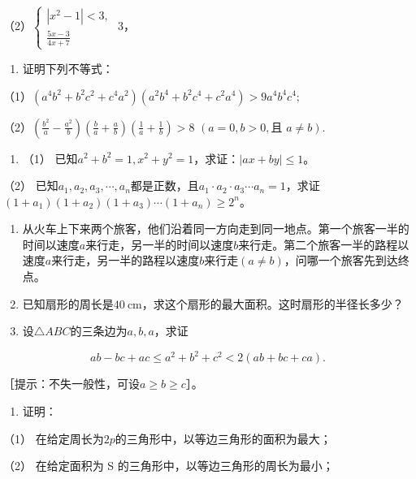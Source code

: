 （2）\(\left\{ \begin{array}{l} |x^2 - 1| < 3, \\ \frac{5x - 3}{4x + 7} \end{array} \right.\)
3，

\begin{enumerate}[start=5]
\item
  证明下列不等式：
\end{enumerate}

（1）\((a^4 b^2 + b^2 c^2 + c^4 a^2)(a^2 b^4 + b^2 c^4 + c^2 a^4) > 9a^4 b^4 c^4;\)

（2）\(\left(\frac{b^2}{a} - \frac{a^2}{b}\right)\left(\frac{b}{a} + \frac{a}{b}\right)\left(\frac{1}{a} + \frac{1}{b}\right) > 8\)
\((a=0, b>0, \text{且 } a\neq b).\)

\begin{enumerate}[start=6]
\item
  （1）
  已知\(a^2 + b^2 = 1, x^2 + y^2 = 1\)，求证：\(|ax + by| \leqslant 1\)。
\end{enumerate}

（2）
已知\(a_1, a_2, a_3, \cdots, a_n\)都是正数，且\(a_1 \cdot a_2 \cdot a_3 \cdots a_n = 1\)，求证\((1 + a_1)(1 + a_2)(1 + a_3) \cdots (1 + a_n) \geqslant 2^n\)。

\begin{enumerate}[start=7]
\item
  从火车上下来两个旅客，他们沿着同一方向走到同一地点。第一个旅客一半的时间以速度\(a\)来行走，另一半的时间以速度\(b\)来行走。第二个旅客一半的路程以速度\(a\)来行走，另一半的路程以速度\(b\)来行走\((a \neq b)\)，问哪一个旅客先到达终点。
\item
  已知扇形的周长是\(40 \mathrm{~cm}\)，求这个扇形的最大面积。这时扇形的半径长多少？
\item
  设\(\triangle ABC\)的三条边为\(a, b, a\)，求证
\end{enumerate}

\[
a b - b c + a c \leqslant a^{2} + b^{2} + c^{2} < 2 (a b + b c + c a).
\]

［提示：不失一般性，可设\(a \geqslant b \geqslant c\)］。

\begin{enumerate}[start=10]
\item
  证明：
\end{enumerate}

（1） 在给定周长为\(2p\)的三角形中，以等边三角形的面积为最大；

（2） 在给定面积为 S 的三角形中，以等边三角形的周长为最小；

